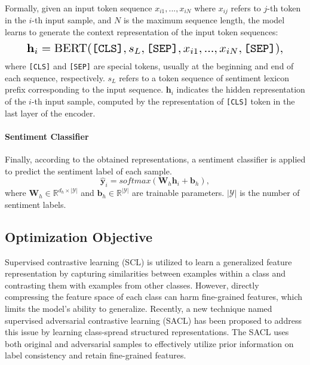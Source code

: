 \documentclass[11pt]{article}
\begin{document}
Formally, given an input token sequence
$x_{i1}, ..., x_{iN}$ where $x_{ij}$ refers to $j$-th token in the $i$-th input sample, and $N$ is the maximum sequence length, the model learns to generate the context representation of the input token sequences: 
\begin{equation}
\resizebox{0.89\linewidth}{!}{$
    \mathbf{h}_i = \text{BERT}(\texttt{[CLS]}, s_L, \texttt{[SEP]}, x_{i1}, ..., x_{iN}, \texttt{[SEP]}),
$}
\end{equation}
where \texttt{[CLS]} and \texttt{[SEP]} are special tokens, usually at the beginning and end of each sequence, respectively. $s_L$ refers to a token sequence of sentiment lexicon prefix corresponding to the input sequence.
$\mathbf{h}_i$ indicates the hidden representation of the $i$-th input sample, computed by the representation of \texttt{[CLS]} token in the last layer of the encoder. 


\paragraph{Sentiment Classifier} \label{sec:senti}
Finally, according to the obtained representations, a sentiment classifier is applied to predict the sentiment label of each sample. 
\begin{equation}
    \hat{\mathbf{y}}_i = softmax(\mathbf{W}_h \mathbf{h}_i + \mathbf{b}_h),    
\end{equation} 
where $\mathbf{W}_h \in \mathbb{R}^{d_h \times |\mathcal{Y}|}$ and $\mathbf{b}_h \in \mathbb{R}^{|\mathcal{Y}|}$ 
are trainable parameters.
$|\mathcal{Y}|$ is the number of sentiment labels.


\subsection{Optimization Objective}
Supervised contrastive learning (SCL) \citep{DBLP:conf/nips/KhoslaTWSTIMLK20,DBLP:conf/iclr/GunelDCS21} is utilized to learn a generalized feature representation by capturing similarities between examples within a class and contrasting them with examples from other classes. However, directly compressing the feature space of each class can harm fine-grained features, which limits the model's ability to generalize. 
Recently, a new technique named supervised adversarial contrastive learning (SACL) \citep{hu2023supervised} has been proposed to address this issue by learning class-spread structured representations. The SACL uses both original and adversarial samples to effectively utilize prior information on label consistency and retain fine-grained features. 
\end{document}
